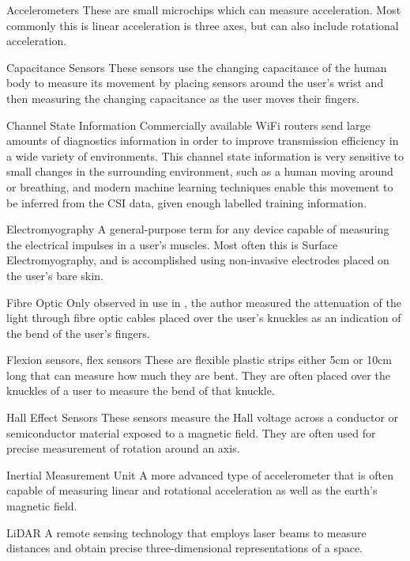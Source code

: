 \begin{Nomencl}[1cm]
    \item[Accelerometers] These are small microchips which can measure acceleration. Most commonly this is linear acceleration is three axes, but can also include rotational acceleration.
    \item[Capacitance Sensors] These sensors use the changing capacitance of the human body to measure its movement by placing sensors around the user's wrist and then measuring the changing capacitance as the user moves their fingers.
    \item[Channel State Information] Commercially available WiFi routers send large amounts of diagnostics information in order to improve transmission efficiency in a wide variety of environments. This channel state information is very sensitive to small changes in the surrounding environment, such as a human moving around or breathing, and modern machine learning techniques enable this movement to be inferred from the CSI data, given enough labelled training information.
    \item[Electromyography] A general-purpose term for any device capable of measuring the electrical impulses in a user's muscles. Most often this is Surface Electromyography, and is accomplished using non-invasive electrodes placed on the user's bare skin.
    \item[Fibre Optic] Only observed in use in \cite{wiseEvaluationFiberOptic1990}, the author measured the attenuation of the light through fibre optic cables placed over the user's knuckles as an indication of the bend of the user's fingers.
    \item[Flexion sensors, flex sensors] These are flexible plastic strips either 5cm or 10cm long that can measure how much they are bent. They are often placed over the knuckles of a user to measure the bend of that knuckle.
    \item[Hall Effect Sensors] These sensors measure the Hall voltage across a conductor or semiconductor material exposed to a magnetic field. They are often used for precise measurement of rotation around an axis.
    \item[Inertial Measurement Unit] A more advanced type of accelerometer that is often capable of measuring linear and rotational acceleration as well as the earth's magnetic field.
    \item[LiDAR] A remote sensing technology that employs laser beams to measure distances and obtain precise three-dimensional representations of a space.

\end{Nomencl}
